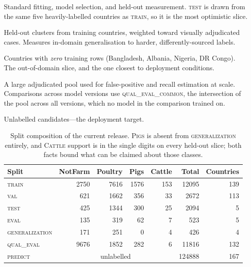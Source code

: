 \documentclass[11pt,a4paper]{article}
\begin{document}
\begin{description}\itemsep2pt
  \item[\textnormal{\textsc{train} / \textsc{val} / \textsc{test}}] Standard
  fitting, model selection, and held-out measurement. \textsc{test} is drawn
  from the same five heavily-labelled countries as \textsc{train}, so it is the
  most optimistic slice.
  \item[\textsc{eval}] Held-out clusters from training countries, weighted
  toward visually adjudicated cases. Measures in-domain generalisation to harder,
  differently-sourced labels.
  \item[\textsc{generalization}] Countries with \emph{zero} training rows
  (Bangladesh, Albania, Nigeria, DR Congo). The out-of-domain slice, and the one
  closest to deployment conditions.
  \item[\textsc{qual\_eval}] A large adjudicated pool used for false-positive
  and recall estimation at scale. Comparisons across model versions use
  \textsc{qual\_eval\_common}, the intersection of the pool across all versions,
  which no model in the comparison trained on.
  \item[\textsc{predict}] Unlabelled candidates---the deployment target.
\end{description}

\begin{table}[t]
\centering
\small
\caption{Split composition of the current release. \textsc{Pigs} is absent from
\textsc{generalization} entirely, and \textsc{Cattle} support is in the single
digits on every held-out slice; both facts bound what can be claimed about those
classes.}
\label{tab:splits}
\begin{tabular}{lrrrrrr}
\toprule
Split & NotFarm & Poultry & Pigs & Cattle & Total & Countries \\
\midrule
\textsc{train}          & \num{2750} & \num{7616} & \num{1576} & 153 & \num{12095} & 139 \\
\textsc{val}            & 621        & \num{1662} & 356        & 33  & \num{2672}  & 113 \\
\textsc{test}           & 425        & \num{1344} & 300        & 25  & \num{2094}  & 5   \\
\textsc{eval}           & 135        & 319        & 62         & 7   & 523         & 5   \\
\textsc{generalization} & 171        & 251        & 0          & 4   & 426         & 4   \\
\textsc{qual\_eval}     & \num{9676} & \num{1852} & 282        & 6   & \num{11816} & 132 \\
\textsc{predict}        & \multicolumn{4}{c}{unlabelled} & \num{124888} & 167 \\
\bottomrule
\end{tabular}
\end{table}
\end{document}
